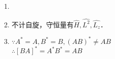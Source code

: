 
\begin{issues}
\issueDraft
\issueTODO
\end{issues}


\subsection{ }
\begin{enumerate}
\item 
\item 不计自旋，守恒量有$\hat H,\hat {L^2},\hat {L_z} $．
\item $\because A^* = A,B^* = B,(AB)^* \neq AB $ \\
$\therefore [BA]^*=A^*B^*=AB $
\end{enumerate}
\subsection{ }
